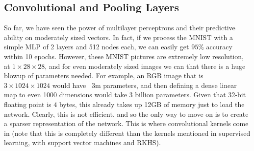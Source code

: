 \documentclass{article}
\theoremstyle{definition}
\theoremstyle{remark}
\theoremstyle{definition}
\begin{document}
  \subsection{Convolutional and Pooling Layers} 

    So far, we have seen the power of multilayer perceptrons and their predictive ability on moderately sized vectors. In fact, if we process the MNIST with a simple MLP of 2 layers and 512 nodes each, we can easily get $95\%$ accuracy within 10 epochs. However, these MNIST pictures are extremely low resolution, at $1 \times 28 \times 28$, and for even moderately sized images we can that there is a huge blowup of parameters needed. For example, an RGB image that is $3 \times 1024 \times 1024$ would have ~3m parameters, and then defining a dense linear map to even 1000 dimensions would take 3 billion parameters. Given that 32-bit floating point is $4$ bytes, this already takes up 12GB of memory just to load the network. Clearly, this is not efficient, and so the only way to move on is to create a sparser representation of the network. This is where convolutional kernels come in (note that this is completely different than the kernels mentioned in supervised learning, with support vector machines and RKHS). 
\end{document}
